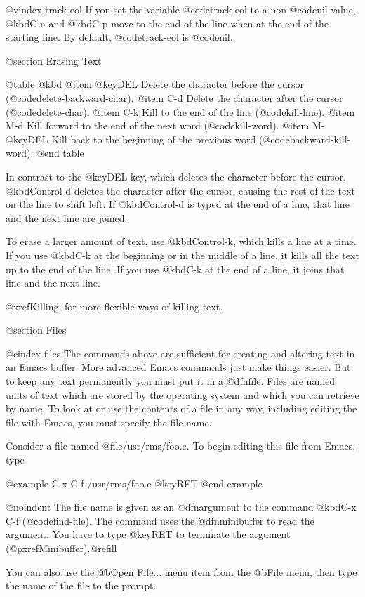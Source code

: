 {{@vindex track-eol
  If you set the variable @code{track-eol} to a non-@code{nil} value,
@kbd{C-n} and @kbd{C-p} move to the end of the line when at the end of
the starting line.  By default, @code{track-eol} is @code{nil}.

@section Erasing Text

@table @kbd
@item @key{DEL}
Delete the character before the cursor (@code{delete-backward-char}).
@item C-d
Delete the character after the cursor (@code{delete-char}).
@item C-k
Kill to the end of the line (@code{kill-line}).
@item M-d
Kill forward to the end of the next word (@code{kill-word}).
@item M-@key{DEL}
Kill back to the beginning of the previous word
(@code{backward-kill-word}).
@end table

  In contrast to the @key{DEL} key, which deletes the character before
the cursor, @kbd{Control-d} deletes the character after the cursor,
causing the rest of the text on the line to shift left.  If
@kbd{Control-d} is typed at the end of a line, that line and the next
line are joined.

  To erase a larger amount of text, use @kbd{Control-k}, which kills a
line at a time.  If you use @kbd{C-k} at the beginning or in the middle
of a line, it kills all the text up to the end of the line.  If you use
@kbd{C-k} at the end of a line, it joins that line and the next
line.

  @xref{Killing}, for more flexible ways of killing text.

@section Files

@cindex files
  The commands above are sufficient for creating and altering text in an
Emacs buffer.  More advanced Emacs commands just make things easier.  But
to keep any text permanently you must put it in a @dfn{file}.  Files are
named units of text which are stored by the operating system and which
you can retrieve by name.  To look at or use the contents of a file in
any way, including editing the file with Emacs, you must specify the
file name.

  Consider a file named @file{/usr/rms/foo.c}.  To begin editing
this file from Emacs, type

@example
C-x C-f /usr/rms/foo.c @key{RET}
@end example

@noindent
The file name is given as an @dfn{argument} to the command @kbd{C-x
C-f} (@code{find-file}).  The command uses the @dfn{minibuffer} to
read the argument.  You have to type @key{RET} to terminate the argument
(@pxref{Minibuffer}).@refill

  You can also use the @b{Open File...} menu item from the @b{File} menu, then
type the name of the file to the prompt.

}}
